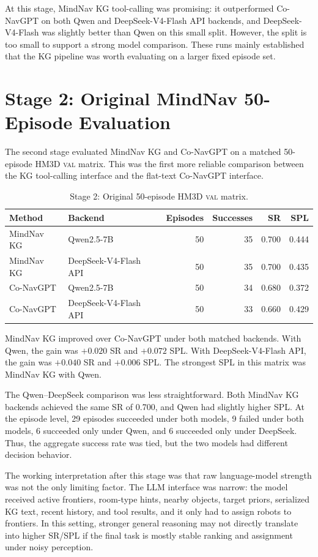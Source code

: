 \documentclass[11pt]{article}
\newcommand{\tablefont}{\footnotesize}
\begin{document}
At this stage, MindNav KG tool-calling was promising: it outperformed Co-NavGPT
on both Qwen and DeepSeek-V4-Flash API backends, and DeepSeek-V4-Flash was
slightly better than Qwen on this small split. However, the split is too small
to support a strong model
comparison. These runs mainly established that the KG pipeline was worth
evaluating on a larger fixed episode set.

\section{Stage 2: Original MindNav 50-Episode Evaluation}

The second stage evaluated MindNav KG and Co-NavGPT on a matched 50-episode
HM3D \textsc{val} matrix. This was the first more reliable comparison between
the KG tool-calling interface and the flat-text Co-NavGPT interface.

\begin{table}[t]
\centering
\tablefont
\caption{Stage 2: Original 50-episode HM3D \textsc{val} matrix.}
\label{tab:stage2-val50}
\begin{tabular}{llrrrr}
\hline
Method & Backend & Episodes & Successes & SR & SPL \\
\hline
MindNav KG & Qwen2.5-7B & 50 & 35 & 0.700 & 0.444 \\
MindNav KG & DeepSeek-V4-Flash API & 50 & 35 & 0.700 & 0.435 \\
Co-NavGPT & Qwen2.5-7B & 50 & 34 & 0.680 & 0.372 \\
Co-NavGPT & DeepSeek-V4-Flash API & 50 & 33 & 0.660 & 0.429 \\
\hline
\end{tabular}
\end{table}

MindNav KG improved over Co-NavGPT under both matched backends. With Qwen, the
gain was \(+0.020\) SR and \(+0.072\) SPL. With DeepSeek-V4-Flash API, the gain
was \(+0.040\) SR and \(+0.006\) SPL. The strongest SPL in this matrix was
MindNav KG with Qwen.

The Qwen--DeepSeek comparison was less straightforward. Both MindNav KG
backends achieved the same SR of 0.700, and Qwen had slightly higher SPL. At
the episode level, 29 episodes succeeded under both models, 9 failed under both
models, 6 succeeded only under Qwen, and 6 succeeded only under DeepSeek. Thus,
the aggregate success rate was tied, but the two models had different decision
behavior.

The working interpretation after this stage was that raw language-model
strength was not the only limiting factor. The LLM interface was narrow: the
model received active frontiers, room-type hints, nearby objects, target priors,
serialized KG text, recent history, and tool results, and it only had to assign
robots to frontiers. In this setting, stronger general reasoning may not
directly translate into higher SR/SPL if the final task is mostly stable
ranking and assignment under noisy perception.
\end{document}
